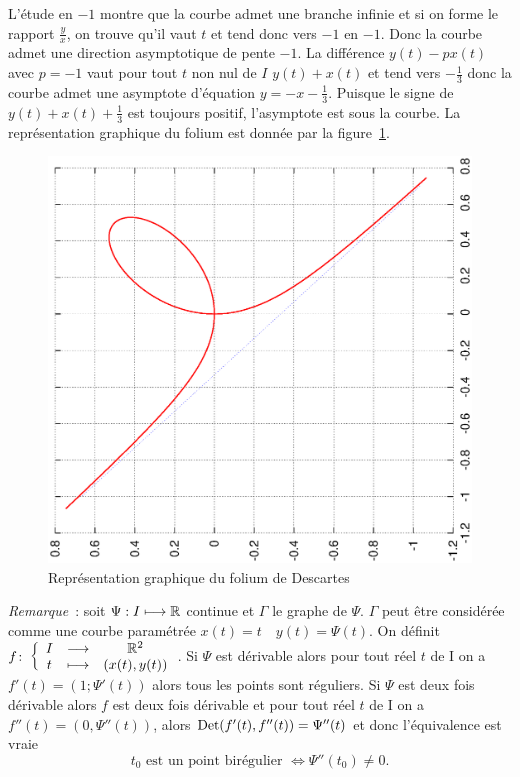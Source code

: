 L'étude en $-1$ montre que la courbe admet une branche infinie et si on forme le rapport $\frac{y}{x}$, on trouve qu'il vaut $t$ et tend donc vers $-1$ en $-1$. Donc la courbe admet une direction asymptotique de pente $-1$. La différence $y(t)-px(t)$ avec $p=-1$ vaut pour tout $t$ non nul de $I$ $y(t)+x(t)$ et tend vers $-\frac{1}{3}$ donc la courbe admet une asymptote d'équation $y=-x-\frac{1}{3}$. Puisque le signe de $y(t)+x(t)+\frac{1}{3}$ est toujours positif, l'asymptote est sous la courbe. La représentation graphique du folium est donnée par la figure~\ref{fig:folium}.
\begin{figure}
 \centering
 \includegraphics[scale=0.45, angle=-90]{folium.ps}
 \caption{Représentation graphique du folium de Descartes}
 \label{fig:folium}
\end{figure}

\emph{Remarque}~:
soit $\Psi : I \longmapsto \mathbb{R}$ continue et $\Gamma$ le graphe de $\Psi$. $\Gamma$ peut être considérée comme une courbe paramétrée $x(t)=t \quad y(t)=\Psi(t)$. On définit $f\colon \left\{\begin{array}{ccc} I & \longrightarrow &\mathbb{R}^2\\ t & \longmapsto & (x(t),y(t)) \end{array} \right.$. Si $\Psi$ est dérivable alors pour tout réel $t$ de I on a $f'(t)=(1;\Psi'(t))$ alors tous les points sont réguliers. Si $\Psi$ est deux fois dérivable alors $f$ est deux fois dérivable et pour tout réel $t$ de I on a $f''(t)=(0,\Psi''(t))$, alors $\operatorname{Det}(f'(t),f''(t))=\Psi''(t)$ et donc l'équivalence est vraie
\begin{equation}
 t_0 \text{~est un point birégulier } \iff \Psi''(t_0) \neq 0.
\end{equation}

